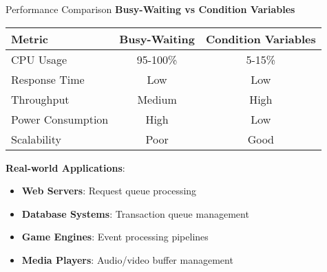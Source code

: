 \begin{frame}[fragile]{ Performance Comparison}
	\textbf{Busy-Waiting vs Condition Variables}

	\begin{table}[h]
		\centering
		\begin{tabular}{|l|c|c|}
			\hline
			\textbf{Metric}   & \textbf{Busy-Waiting} & \textbf{Condition Variables} \\
			\hline
			CPU Usage         & 95-100\%              & 5-15\%                       \\
			Response Time     & Low                   & Low                          \\
			Throughput        & Medium                & High                         \\
			Power Consumption & High                  & Low                          \\
			Scalability       & Poor                  & Good                         \\
			\hline
		\end{tabular}
	\end{table}

	\vspace{1em}
	\textbf{Real-world Applications}:
	\begin{itemize}
		\item \textbf{Web Servers}: Request queue processing
		\item \textbf{Database Systems}: Transaction queue management
		\item \textbf{Game Engines}: Event processing pipelines
		\item \textbf{Media Players}: Audio/video buffer management
	\end{itemize}
\end{frame}
